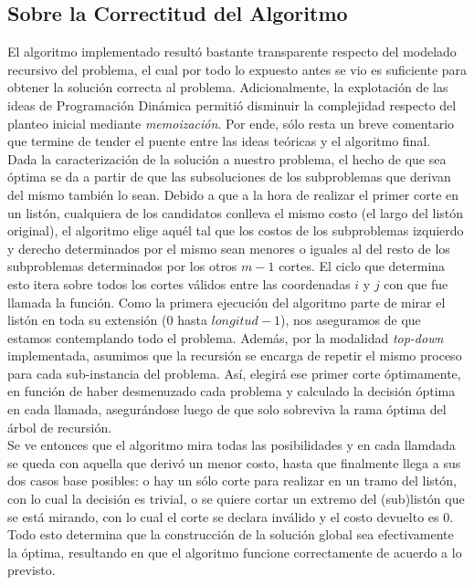 \subsection{Sobre la Correctitud del Algoritmo}

El algoritmo implementado resultó bastante transparente respecto del modelado recursivo del problema, el cual por todo lo expuesto antes se vio es suficiente para obtener la solución correcta al problema. Adicionalmente, la explotación de las ideas de Programación Dinámica permitió disminuir la complejidad respecto del planteo inicial mediante \textit{memoización}. Por ende, sólo resta un breve comentario que termine de tender el puente entre las ideas teóricas y el algoritmo final.\\
\indent Dada la caracterización de la solución a nuestro problema, el hecho de que sea óptima se da a partir de que las subsoluciones de los subproblemas que derivan del mismo también lo sean. Debido a que a la hora de realizar el primer corte en un listón, cualquiera de los candidatos conlleva el mismo costo (el largo del listón original), el algoritmo elige aquél tal que los costos de los subproblemas izquierdo y derecho determinados por el mismo sean menores o iguales al del resto de los subproblemas determinados por los otros $m-1$ cortes. El ciclo que determina esto itera sobre todos los cortes válidos entre las coordenadas $i$ y $j$ con que fue llamada la función. Como la primera ejecución del algoritmo parte de mirar el listón en toda su extensión ($0$ hasta $longitud-1$), nos aseguramos de que estamos contemplando todo el problema. Además, por la modalidad \textit{top-down} implementada, asumimos que la recursión se encarga de repetir el mismo proceso para cada sub-instancia del problema. Así, elegirá ese primer corte óptimamente, en función de haber desmenuzado cada problema y calculado la decisión óptima en cada llamada, asegurándose luego de que solo sobreviva la rama óptima del árbol de recursión.\\
\indent Se ve entonces que el algoritmo mira todas las posibilidades y en cada llamdada se queda con aquella que derivó un menor costo, hasta que finalmente llega a sus dos casos base posibles: o hay un sólo corte para realizar en un tramo del listón, con lo cual la decisión es trivial, o se quiere cortar un extremo del (sub)listón que se está mirando, con lo cual el corte se declara inválido y el costo devuelto es $0$. Todo esto determina que la construcción de la solución global sea efectivamente la óptima, resultando en que el algoritmo funcione correctamente de acuerdo a lo previsto. 

